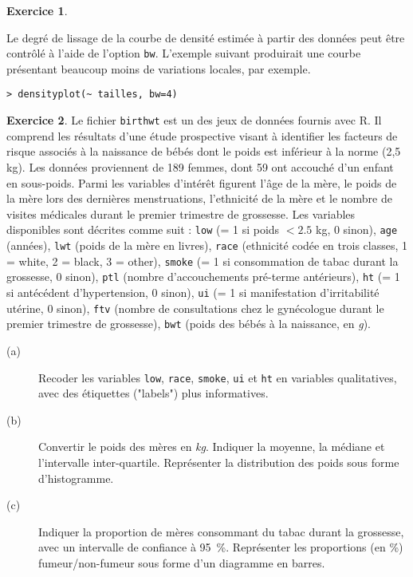 \documentclass[11pt]{report}
\makeatletter
\theoremstyle{definition}
\newtheorem{exo}{Exercice}[chapter]
\newcommand{\R}{\textsf{R}\xspace}
\newcommand{\foo}[1]{\texttt{#1}}
\newcommand{\cmd}[1]{\index{#1@\foo{#1}}}
\makeatother
\begin{document}
\begin{exo}
\begin{sol}
\noindent Le degré de lissage de la courbe de densité estimée à partir des
données peut être contrôlé à l'aide de l'option \texttt{bw}. L'exemple
suivant produirait une courbe présentant beaucoup moins de variations
locales, par exemple.
\begin{verbatim}
> densityplot(~ tailles, bw=4)
\end{verbatim}
\cmd{densityplot}
\end{sol}
\end{exo}
% 
%
\begin{exo}\label{exo:2.4}
Le fichier \texttt{birthwt} est un des jeux de données fournis avec \R. Il
comprend les résultats d'une étude prospective visant à identifier les
facteurs de risque associés à la naissance de bébés dont le poids est
inférieur à la norme (2,5 kg). Les données proviennent de 189 femmes, dont
59 ont accouché d'un enfant en sous-poids. Parmi les variables d'intérêt
figurent l'âge de la mère, le poids de la mère lors des dernières
menstruations, l'ethnicité de la mère et le nombre de visites médicales
durant le premier trimestre de grossesse.\autocite{hosmer89}
Les variables disponibles sont décrites comme suit : \texttt{low} (= 1 si
poids $<2.5$ kg, 0 sinon), \texttt{age} (années), \texttt{lwt} (poids de la
mère en livres), \texttt{race} (ethnicité codée en trois classes, 1 = white,
2 = black, 3 = other), \texttt{smoke} (= 1 si consommation de tabac durant
la grossesse, 0 sinon), \texttt{ptl} (nombre d'accouchements pré-terme
antérieurs), \texttt{ht} (= 1 si antécédent d'hypertension, 0 sinon),
\texttt{ui} (= 1 si manifestation d'irritabilité utérine, 0 sinon),
\texttt{ftv} (nombre de consultations chez le gynécologue durant le premier
trimestre de grossesse), \texttt{bwt} (poids des bébés à la naissance, en
\emph{g}).
\begin{description}
\item[(a)] Recoder les variables \texttt{low}, \texttt{race},
  \texttt{smoke}, \texttt{ui} et \texttt{ht} en variables
  qualitatives, avec des étiquettes ("labels") plus informatives.
\item[(b)] Convertir le poids des mères en \emph{kg}. Indiquer la moyenne, la
  médiane et l'intervalle inter-quartile. Représenter la distribution des
  poids sous forme d'histogramme.
\item[(c)] Indiquer la proportion de mères consommant du tabac durant la
  grossesse, avec un intervalle de confiance à 95~\%. Représenter les
  proportions (en \%) fumeur/non-fumeur sous forme d'un diagramme en
  barres.

\end{description}
\end{exo}
\end{document}
